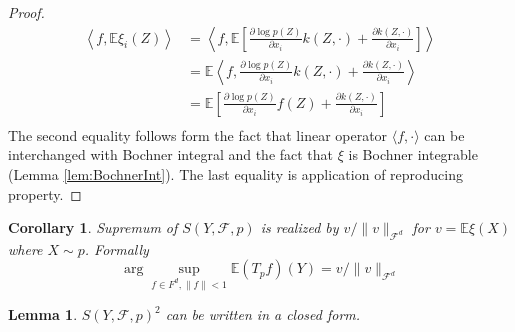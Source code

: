 \documentclass{article}
\newtheorem{lemma}{Lemma}
\newtheorem{corollary}{Corollary}
\newcommand{\ev}{\mathbb{E}}
\begin{document}
\begin{proof}
  \begin{align*}
 \left\langle f, \ev \xi_i(Z) \right\rangle  &= \left\langle f,\ev \left[ \frac{\partial \log p(Z)}{ \partial x_i} k(Z,\cdot)+ \frac{\partial k(Z,\cdot)}{ \partial x_i}\right]\right\rangle \\
  &= \ev \left\langle f, \frac{\partial \log p(Z)}{ \partial x_i} k(Z,\cdot)+ \frac{\partial k(Z,\cdot)}{ \partial x_i}\right\rangle \\
 &=\ev \left[ \frac{\partial \log p(Z)}{ \partial x_i} f(Z)+ \frac{\partial k(Z,\cdot)}{ \partial x_i}\right]\\
\end{align*}
The second equality follows form the fact that linear operator $\langle f , \cdot \rangle$ can be interchanged with Bochner integral and the fact that $\xi$ is Bochner integrable (Lemma \ref{lem:BochnerInt}). The last equality is application of reproducing property.    
\end{proof}

\begin{corollary}
 Supremum of $S(Y,\mathcal{F},p)$ is realized  by  $ v/\|v \|_{\mathcal{F}^d}$ for $v = \ev \xi(X)$ where $X \sim p$. Formally
 \[
  \arg \sup_{f \in F^d, \| f \|<1} \ev (T_{p}f) (Y) =  v/\|v \|_{\mathcal{F}^d}
 \]
\end{corollary}



\begin{lemma}
\label{th1}
$S(Y,\mathcal{F},p)^2$ can be written in a closed form. 
\end{lemma}
\end{document}
